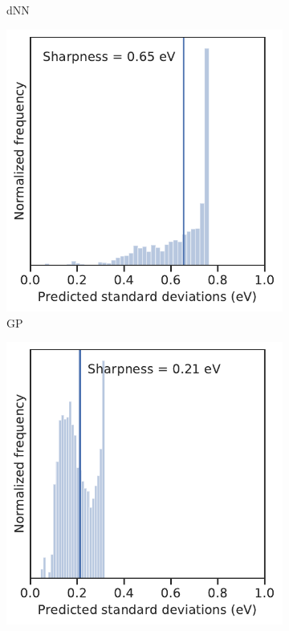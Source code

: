 \documentclass[]{achemso}
\begin{document}
\begin{figure}
\begin{subfigure}{0.32\textwidth}
        \caption{\gls{dNN}}\label{fig:sharpness_dnn}
    \end{subfigure}
    \begin{subfigure}{0.32\textwidth}
        \includegraphics[width=\textwidth]{../GP/Matern/sharpness.pdf}
        \caption{\gls{GP}}\label{fig:sharpness_gp}
    \end{subfigure}
    \begin{subfigure}{0.32\textwidth}
        \includegraphics[width=\textwidth]{../NNdGP/Matern/sharpness.pdf}

\end{subfigure}
\end{figure}
\end{document}
